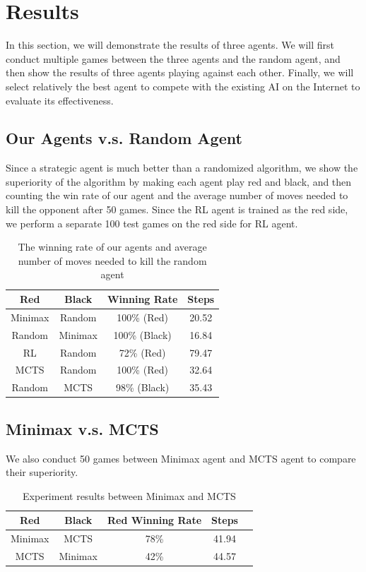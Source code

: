 \documentclass[letterpaper]{article}
\begin{document}
\section{Results}\label{sec:results}
In this section, we will demonstrate the results of three agents.
We will first conduct multiple games between the three agents and the random agent, and then show the results of three agents playing against each other.
Finally, we will select relatively the best agent to compete with the existing AI on the Internet to evaluate its effectiveness.

\subsection{Our Agents v.s. Random Agent}
\label{subsec:our-agents-vs-random-agent}
Since a strategic agent is much better than a randomized algorithm, we show the superiority of the algorithm by making each agent play red and black, and then counting the win rate of our agent and the average number of moves needed to kill the opponent after 50 games.
Since the RL agent is trained as the red side, we perform a separate 100 test games on the red side for RL agent.
\begin{table}[htbp]
    \centering
    \caption{The winning rate of our agents and average number of moves needed to kill the random agent}
    \label{tab:tab1}
    \begin{tabular}{|c|c|c|c|}
        \hline
        Red & Black & Winning Rate & Steps  \\ \hline
        Minimax & Random & 100\% (Red) & 20.52 \\ \hline
        Random & Minimax & 100\% (Black) & 16.84 \\ \hline
        RL & Random & 72\% (Red) & 79.47 \\ \hline
        MCTS & Random & 100\% (Red) & 32.64\\ \hline
        Random & MCTS & 98\% (Black) & 35.43\\ \hline
    \end{tabular}
\end{table}

\subsection{Minimax v.s. MCTS}
\label{subsec:minimax-v.s.-mcts}
We also conduct 50 games between Minimax agent and MCTS agent to compare their superiority.
\begin{table}[htbp]
    \centering
    \caption{Experiment results between Minimax and MCTS}
    \label{tab:tab2}
    \begin{tabular}{|c|c|c|c|c|}
        \hline
        Red & Black & Red Winning Rate & Steps  \\ \hline
        Minimax & MCTS & 78\% & 41.94 \\ \hline
        MCTS & Minimax & 42\% & 44.57 \\ \hline
    \end{tabular}
\end{table}
\end{document}
